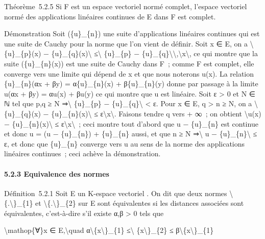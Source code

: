 \documentclass[]{article}
\begin{document}
Théorème~5.2.5 Si F est un espace vectoriel normé complet, l'espace
vectoriel normé des applications linéaires continues de E dans F est
complet.

Démonstration Soit (\{u\}\_\{n\}) une suite d'applications linéaires
continues qui est une suite de Cauchy pour la norme que l'on vient de
définir. Soit x ∈ E, on a \textbackslash{}\textbar{}\{u\}\_\{p\}(x) −
\{u\}\_\{q\}(x)\textbackslash{}\textbar{} ≤\textbackslash{}\textbar{}
\{u\}\_\{p\} −
\{u\}\_\{q\}\textbackslash{}\textbar{}\textbackslash{},\textbackslash{}\textbar{}x\textbackslash{}\textbar{},
ce qui montre que la suite (\{u\}\_\{n\}(x)) est une suite de Cauchy
dans F~; comme F est complet, elle converge vers une limite qui dépend
de x et que nous noterons u(x). La relation \{u\}\_\{n\}(αx + βy) =
α\{u\}\_\{n\}(x) + β\{u\}\_\{n\}(y) donne par passage à la limite u(αx +
βy) = αu(x) + βu(y) ce qui montre que u est linéaire. Soit ε
\textgreater{} 0 et N ∈ ℕ tel que p,q ≥ N ⇒\textbackslash{}\textbar{}
\{u\}\_\{p\} − \{u\}\_\{q\}\textbackslash{}\textbar{} \textless{} ε.
Pour x ∈ E, q \textgreater{} n ≥ N, on a
\textbackslash{}\textbar{}\{u\}\_\{q\}(x) −
\{u\}\_\{n\}(x)\textbackslash{}\textbar{} ≤
ε\textbackslash{}\textbar{}x\textbackslash{}\textbar{}. Faisons tendre q
vers + ∞~; on obtient \textbackslash{}\textbar{}u(x) −
\{u\}\_\{n\}(x)\textbackslash{}\textbar{} ≤
ε\textbackslash{}\textbar{}x\textbackslash{}\textbar{}~; ceci montre
tout d'abord que u − \{u\}\_\{n\} est continue et donc u = (u −
\{u\}\_\{n\}) + \{u\}\_\{n\} aussi, et que n ≥ N
⇒\textbackslash{}\textbar{} u − \{u\}\_\{n\}\textbackslash{}\textbar{} ≤
ε, et donc que \{u\}\_\{n\} converge vers u au sens de la norme des
applications linéaires continues~; ceci achève la démonstration.

\paragraph{5.2.3 Equivalence des normes}

Définition~5.2.1 Soit E un K-espace vectoriel . On dit que deux normes
\textbackslash{}\textbar{}\{.\textbackslash{}\textbar{}\}\_\{1\} et
\textbackslash{}\textbar{}\{.\textbackslash{}\textbar{}\}\_\{2\} sur E
sont équivalentes si les distances associées sont équivalentes,
c'est-à-dire s'il existe α,β \textgreater{} 0 tels que

\textbackslash{}mathop\{∀\}x ∈ E,\textbackslash{}quad
α\textbackslash{}\textbar{}\{x\textbackslash{}\textbar{}\}\_\{1\}
≤\textbackslash{}\textbar{} \{x\textbackslash{}\textbar{}\}\_\{2\} ≤
β\textbackslash{}\textbar{}\{x\textbackslash{}\textbar{}\}\_\{1\}
\end{document}

